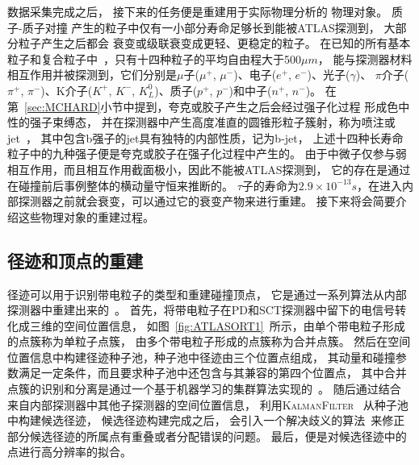 数据采集完成之后，
接下来的任务便是重建用于实际物理分析的
物理对象。
质子-质子对撞
产生的粒子中仅有一小部分寿命足够长到能被ATLAS探测到，
大部分粒子产生之后都会
衰变或级联衰变成更轻、更稳定的粒子。
在已知的所有基本粒子和复合粒子中~\cite{PDG}，只有十四种粒子的平均自由程大于500$\mu m$，
能与探测器材料相互作用并被探测到，它们分别是$\mu$子($\mu^+$, $\mu^-$)、电子($e^+$, $e^-$)、光子($\gamma$)、
$\pi$介子($\pi^+$, $\pi^-$)、K介子($K^+$, $K^-$, $K_L^0$)、质子($p^+$, $p^-$)和中子($n^+$, $n^-$)。
在第~\ref{sec:MCHARD}小节中提到，夸克或胶子产生之后会经过强子化过程
形成色中性的强子束缚态，
并在探测器中产生高度准直的圆锥形粒子簇射，称为喷注或jet~\cite{JETS}，
其中包含b强子的jet具有独特的内部性质，记为b-jet，
上述十四种长寿命粒子中的九种强子便是夸克或胶子在强子化过程中产生的。
由于中微子仅参与弱相互作用，而且相互作用截面极小，因此不能被ATLAS探测到，
它的存在是通过在碰撞前后事例整体的横动量守恒来推断的。
$\tau$子的寿命为$2.9×10^{−13}s$，在进入内部探测器之前就会衰变，可以通过它的衰变产物来进行重建。
接下来将会简要介绍这些物理对象的重建过程。


\subsection{径迹和顶点的重建}
\label{sec:TRACKS}

径迹可以用于识别带电粒子的类型和重建碰撞顶点，
它是通过一系列算法从内部探测器中重建出来的~\cite{TRACK1}。
首先，将带电粒子在PD和SCT探测器中留下的电信号转化成三维的空间位置信息，
如图~\ref{fig:ATLASORT1}~所示，由单个带电粒子形成的点簇称为单粒子点簇，
由多个带电粒子形成的点簇称为合并点簇。
然后在空间位置信息中构建径迹种子池，种子池中径迹由三个位置点组成，
其动量和碰撞参数满足一定条件，而且要求种子池中还包含与其兼容的第四个位置点，
其中合并点簇的识别和分离是通过一个基于机器学习的集群算法实现的~\cite{NNCLUSTER}。
随后通过结合
来自内部探测器中其他子探测器的空间位置信息，
利用\textsc{KalmanFilter}
~\cite{KALMAN}从种子池中构建候选径迹，
候选径迹构建完成之后，
会引入一个解决歧义的算法~\cite{TRACK1}来修正部分候选径迹的所属点有重叠或者分配错误的问题。
最后，便是对候选径迹中的点进行高分辨率的拟合。

